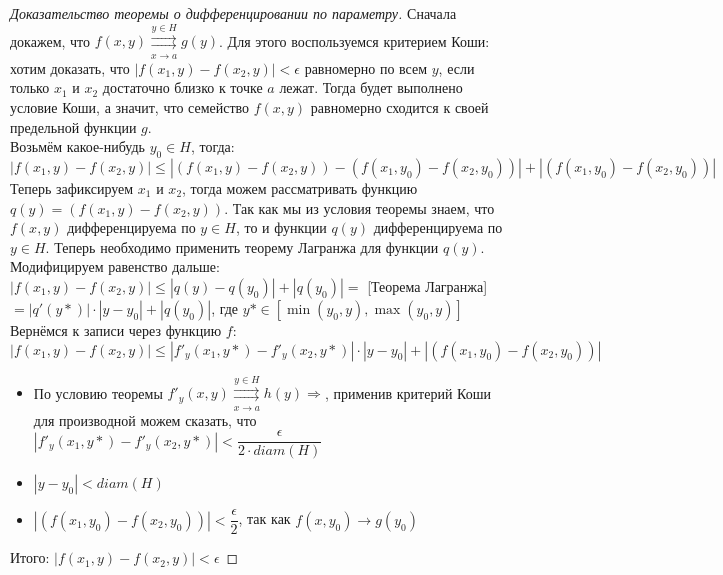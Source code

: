 \begin{proof}[Доказательство теоремы о дифференцировании по параметру]
   Сначала докажем, что $f(x, y) \overset{y \in H}{\underset{x \to a}{\rightrightarrows}} g(y)$. Для
   этого воспользуемся критерием Коши: хотим доказать, что $|f(x_1, y) - f(x_2, y)| < \epsilon$
   равномерно по всем $y$, если только $x_1$ и $x_2$ достаточно близко к точке $a$ лежат. Тогда будет
   выполнено условие Коши, а значит, что семейство $f(x, y)$ равномерно сходится к своей предельной
   функции $g$. \\
   Возьмём какое-нибудь $y_0 \in H$, тогда: \\
   $|f(x_1, y) - f(x_2, y)| \leqslant |(f(x_1, y) - f(x_2, y)) - (f(x_1, y_0) - f(x_2, y_0))| +
   |(f(x_1, y_0) - f(x_2, y_0))|$ \\
   Теперь зафиксируем $x_1$ и $x_2$, тогда можем рассматривать функцию $q(y) = (f(x_1, y) - f(x_2, y))$.
   Так как мы из условия теоремы знаем, что $f(x,y)$ дифференцируема по $y \in H$, то и 
   функции $q(y)$ дифференцируема по $y \in H$. Теперь необходимо применить теорему Лагранжа
   для функции $q(y)$. Модифицируем равенство дальше: \\
   $|f(x_1, y) - f(x_2, y)| \leqslant |q(y) - q(y_0)| +
   |q(y_0)| =$ [Теорема Лагранжа] $= |q'(y*)| \cdot |y - y_0| + |q(y_0)|$, где
   $y* \in [\min(y_0, y), \max(y_0, y)]$ \\
   Вернёмся к записи через функцию $f$: \\
   $|f(x_1, y) - f(x_2, y)|  \leqslant |f'_y(x_1, y*) - f'_y(x_2, y*)|\cdot |y - y_0| +|(f(x_1, y_0) - f(x_2, y_0))| $ \\
   \begin{itemize}
       \item По условию теоремы $f'_y(x, y) \overset{y \in H}{\underset{x \to a}{\rightrightarrows}} h(y) \Rightarrow$,
   применив критерий Коши для производной можем сказать, что $|f'_y(x_1, y*) - f'_y(x_2, y*)|
   < \dfrac{\epsilon}{2 \cdot diam(H)}$
        \item $|y - y_0| < diam(H)$
        \item $|(f(x_1, y_0) - f(x_2, y_0))| < \dfrac{\epsilon}{2}$, так как
        $f(x, y_0) \to g(y_0)$  
    \end{itemize}
    Итого: $|f(x_1, y) - f(x_2, y)| < \epsilon$


\end{proof}
